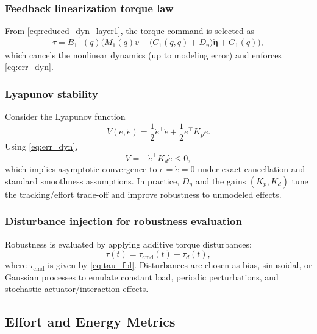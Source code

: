 \documentclass[conference]{IEEEtran}
\newcommand{\etav}{\bm{\eta}}
\begin{document}
\subsubsection{Feedback linearization torque law}

From \eqref{eq:reduced_dyn_layer1}, the torque command is selected as
\begin{equation}
\tau
=
B_1^{-1}(q)
\Big(
M_1(q)v
+
\big(C_1(q,\dot q)+D_\eta\big)\dot{\etav}
+
G_1(q)
\Big),
\label{eq:tau_fbl}
\end{equation}
which cancels the nonlinear dynamics (up to modeling error) and enforces
\eqref{eq:err_dyn}.

\subsubsection{Lyapunov stability}

Consider the Lyapunov function
\begin{equation}
V(e,\dot e)=\frac{1}{2}\dot e^\top \dot e + \frac{1}{2} e^\top K_p e.
\end{equation}
Using \eqref{eq:err_dyn},
\begin{equation}
\dot V = -\dot e^\top K_d \dot e \le 0,
\end{equation}
which implies asymptotic convergence to $e=\dot e=0$ under exact cancellation
and standard smoothness assumptions. In practice, $D_\eta$ and the gains
$(K_p,K_d)$ tune the tracking/effort trade-off and improve robustness to
unmodeled effects.

\subsubsection{Disturbance injection for robustness evaluation}

Robustness is evaluated by applying additive torque disturbances:
\begin{equation}
\tau(t)=\tau_{\mathrm{cmd}}(t)+\tau_d(t),
\label{eq:tau_disturbed}
\end{equation}
where $\tau_{\mathrm{cmd}}$ is given by \eqref{eq:tau_fbl}. Disturbances are
chosen as bias, sinusoidal, or Gaussian processes to emulate constant load,
periodic perturbations, and stochastic actuator/interaction effects.

\subsection{Effort and Energy Metrics}
\label{subsec:effort_energy}
\end{document}
